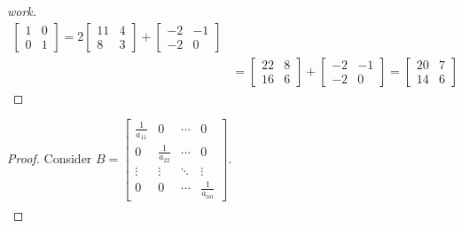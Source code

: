 \documentclass{article}
\begin{document}
\begin{question}{1.4}{}
\begin{proof}[work]
\begin{align*}
      \begin{bmatrix}
        1 & 0 \\
        0 & 1
      \end{bmatrix}=
      2\begin{bmatrix}
         11 & 4 \\
         8  & 3
       \end{bmatrix} +
      \begin{bmatrix}
        -2 & -1 \\
        -2 & 0
      \end{bmatrix}                             \\
                          & =
      \begin{bmatrix}
        22 & 8 \\
        16 & 6
      \end{bmatrix} +
      \begin{bmatrix}
        -2 & -1 \\
        -2 & 0
      \end{bmatrix} =
      \begin{bmatrix}
        20 & 7 \\
        14 & 6
      \end{bmatrix}
    \end{align*}
  \end{proof}
  \begin{proof}
    Consider $B = \begin{bmatrix}
        \frac{1}{a_{11}} & 0                & \cdots & 0                \\
        0                & \frac{1}{a_{22}} & \cdots & 0                \\
        \vdots           & \vdots           & \ddots & \vdots           \\
        0                & 0                & \cdots & \frac{1}{a_{nn}}
      \end{bmatrix}$.
    \begin{align*}

\end{align*}
\end{proof}
\end{question}
\end{document}
